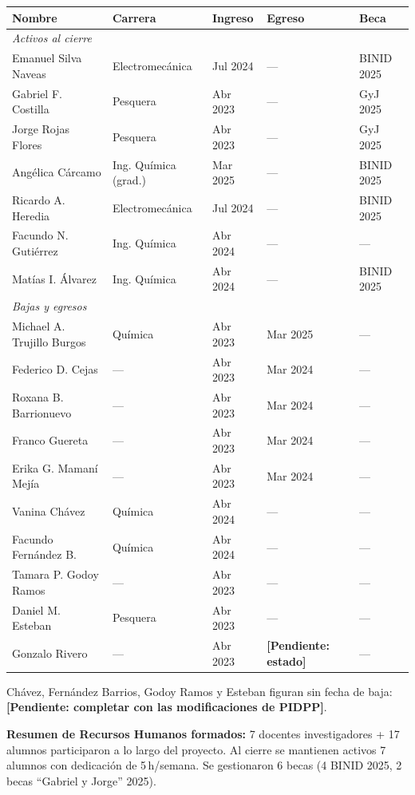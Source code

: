 \documentclass[12pt, a4paper]{article}
\newcommand{\porconf}[1]{\textcolor{orange!85!black}{#1}}
\newcommand{\pend}[1]{\textcolor{red!70!black}{\textbf{[Pendiente: #1]}}}
\begin{document}
\begin{longtable}{p{4.5cm}p{3cm}p{2cm}p{2cm}p{2cm}}
\toprule
\textbf{Nombre} & \textbf{Carrera} & \textbf{Ingreso} & \textbf{Egreso} & \textbf{Beca} \\
\midrule
\multicolumn{5}{l}{\textit{Activos al cierre}} \\
\midrule
Emanuel Silva Naveas & Electromecánica & Jul 2024 & --- & BINID 2025 \\
Gabriel F. Costilla & Pesquera & Abr 2023 & --- & GyJ 2025 \\
Jorge Rojas Flores & \porconf{Pesquera} & Abr 2023 & --- & GyJ 2025 \\
Angélica Cárcamo & Ing. Química (grad.) & Mar 2025 & --- & BINID 2025 \\
Ricardo A. Heredia & Electromecánica & Jul 2024 & --- & BINID 2025 \\
Facundo N. Gutiérrez & Ing. Química & Abr 2024 & --- & --- \\
Matías I. Álvarez & Ing. Química & Abr 2024 & --- & BINID 2025 \\
\midrule
\multicolumn{5}{l}{\textit{Bajas y egresos}} \\
\midrule
Michael A. Trujillo Burgos & Química & Abr 2023 & Mar 2025 & --- \\
Federico D. Cejas & --- & Abr 2023 & Mar 2024 & --- \\
Roxana B. Barrionuevo & --- & Abr 2023 & Mar 2024 & --- \\
Franco Guereta & --- & Abr 2023 & Mar 2024 & --- \\
Erika G. Mamaní Mejía & --- & Abr 2023 & Mar 2024 & --- \\
Vanina Chávez & Química & Abr 2024 & --- & --- \\
Facundo Fernández B. & Química & Abr 2024 & --- & --- \\
Tamara P. Godoy Ramos & --- & Abr 2023 & --- & --- \\
Daniel M. Esteban & Pesquera & Abr 2023 & --- & --- \\
Gonzalo Rivero & --- & Abr 2023 & \pend{estado} & --- \\
\bottomrule
\end{longtable}

{\footnotesize Chávez, Fernández Barrios, Godoy Ramos y Esteban figuran sin fecha de baja: \pend{completar con las modificaciones de PIDPP}.}

\textbf{Resumen de Recursos Humanos formados:} \porconf{7 docentes investigadores + 17 alumnos} participaron a lo largo del proyecto. Al cierre se mantienen activos 7 alumnos con dedicación de 5\,h/semana. Se gestionaron 6 becas (4 BINID 2025, 2 becas ``Gabriel y Jorge'' 2025).
\end{document}
